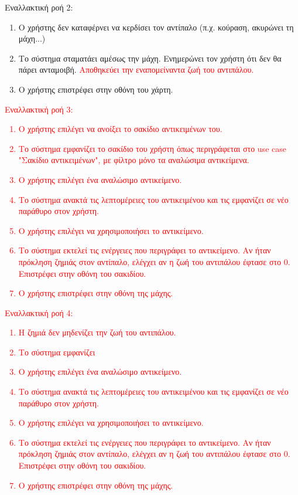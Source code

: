 Εναλλακτική ροή 2:
\begin{enumerate}[label=6.\alph*.,ref=6.\alph*]
    \item Ο χρήστης δεν καταφέρνει να κερδίσει τον αντίπαλο (π.χ. κούραση, ακυρώνει τη μάχη...)
    \item Το σύστημα σταματάει αμέσως την μάχη. Ενημερώνει τον χρήστη ότι δεν θα πάρει ανταμοιβή. \textcolor{red}{Αποθηκεύει
την εναπομείναντα ζωή του αντιπάλου.}
    \item Ο χρήστης επιστρέφει στην οθόνη του χάρτη.
\end{enumerate}

\textcolor{red}{
Εναλλακτική ροή 3:
\begin{enumerate}[label=4.\alph*.,ref=4.\alph*]
    \item Ο χρήστης επιλέγει να ανοίξει το σακίδιο αντικειμένων του.
    \item Το σύστημα εμφανίζει το σακίδιο του χρήστη όπως περιγράφεται στο use case "Σακίδιο αντικειμένων", με φίλτρο μόνο τα αναλώσιμα αντικείμενα.
    \item Ο χρήστης επιλέγει ένα αναλώσιμο αντικείμενο.
    \item Το σύστημα ανακτά τις λεπτομέρειες του αντικειμένου και τις εμφανίζει σε νέο παράθυρο στον χρήστη.
    \item Ο χρήστης επιλέγει να χρησιμοποιήσει το αντικείμενο.
    \item Το σύστημα εκτελεί τις ενέργειες που περιγράφει το αντικείμενο. Αν ήταν πρόκληση ζημιάς στον αντίπαλο, ελέγχει αν η ζωή του αντιπάλου έφτασε στο 0. Επιστρέφει στην οθόνη του σακιδίου.
    \item Ο χρήστης επιστρέφει στην οθόνη της μάχης.
\end{enumerate}
}

\textcolor{red}{
Εναλλακτική ροή 4:
\begin{enumerate}[label=6.\alph*.,ref=6.\alph*]
    \item Η ζημιά δεν μηδενίζει την ζωή του αντιπάλου.
    \item Το σύστημα εμφανίζει 
    \item Ο χρήστης επιλέγει ένα αναλώσιμο αντικείμενο.
    \item Το σύστημα ανακτά τις λεπτομέρειες του αντικειμένου και τις εμφανίζει σε νέο παράθυρο στον χρήστη.
    \item Ο χρήστης επιλέγει να χρησιμοποιήσει το αντικείμενο.
    \item Το σύστημα εκτελεί τις ενέργειες που περιγράφει το αντικείμενο. Αν ήταν πρόκληση ζημιάς στον αντίπαλο, ελέγχει αν η ζωή του αντιπάλου έφτασε στο 0. Επιστρέφει στην οθόνη του σακιδίου.
    \item Ο χρήστης επιστρέφει στην οθόνη της μάχης.
\end{enumerate}
}


